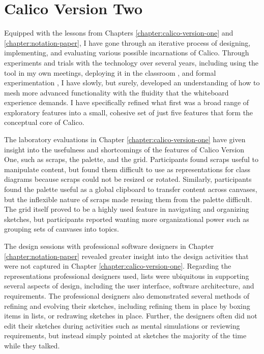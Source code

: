 \chapter{Calico Version Two}
\label{chapter:calico-version-two}

Equipped with the lessons from Chapters \ref{chapter:calico-version-one} and \ref{chapter:notation-paper}, I have gone through an iterative process of designing, implementing, and evaluating various possible incarnations of Calico. Through experiments and trials with the technology over several years, including using the tool in my own meetings, deploying it in the classroom \cite{Loksa2013}, and formal experimentation \cite{mangano2012design}, I have slowly, but surely, developed an understanding of how to mesh more advanced functionality with the fluidity that the whiteboard experience demands. I have specifically refined what first was a broad range of exploratory features into a small, cohesive set of just five features that form the conceptual core of Calico.

The laboratory evaluations in Chapter \ref{chapter:calico-version-one} have given insight into the usefulness and shortcomings of the features of Calico Version One, such as scraps, the palette, and the grid. Participants found scraps useful to manipulate content, but found them difficult to use as representations for class diagrams because scraps could not be resized or rotated. Similarly, participants found the palette useful as a global clipboard to transfer content across canvases, but the inflexible nature of scraps made reusing them from the palette difficult. The grid itself proved to be a highly used feature in navigating and organizing sketches, but participants reported wanting more organizational power such as grouping sets of canvases into topics.

The design sessions with professional software designers in Chapter \ref{chapter:notation-paper} revealed greater insight into the design activities that were not captured in Chapter \ref{chapter:calico-version-one}. Regarding the representations professional designers used, lists were ubiquitous in supporting several aspects of design, including the user interface, software architecture, and requirements. The professional designers also demonstrated several methods of refining and evolving their sketches, including refining them in place by boxing items in lists, or redrawing sketches in place. Further, the designers often did not edit their sketches during activities such as mental simulations or reviewing requirements, but instead simply pointed at sketches the majority of the time while they talked.

